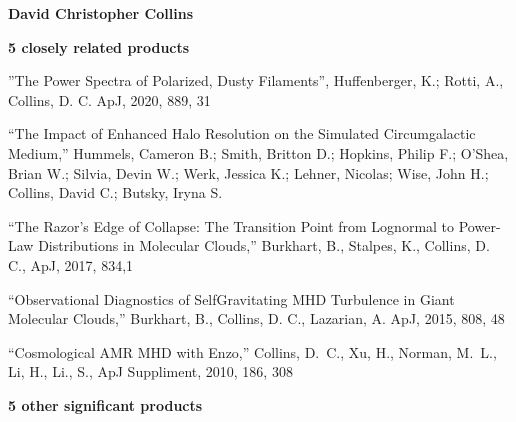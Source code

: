 \documentclass[11pt]{article}
\begin{document}
\noindent 
{\bf\large David Christopher Collins}

\medskip


\medskip

\noindent
\textbf{5 closely related products}

”The Power Spectra of Polarized, Dusty Filaments”, Huffenberger, K.; Rotti, A.,
Collins, D. C. ApJ, 2020, 889, 31

“The Impact of Enhanced Halo Resolution on the Simulated Circumgalactic Medium,”
Hummels, Cameron B.; Smith, Britton D.; Hopkins, Philip F.; O'Shea, Brian W.;
Silvia, Devin W.;
Werk, Jessica K.; Lehner, Nicolas; Wise, John H.; Collins, David C.; Butsky,
Iryna S.

“The Razor’s Edge of Collapse: The Transition Point from Lognormal to Power-Law
Distributions in Molecular Clouds,” Burkhart, B., Stalpes, K., Collins, D. C.,
ApJ, 2017, 834,1

“Observational Diagnostics of Self­Gravitating MHD Turbulence in Giant Molecular
Clouds,” Burkhart, B., Collins, D.  C., Lazarian, A.
ApJ,  2015, 808, 48

“Cosmological AMR MHD with Enzo,” Collins, D.~C., Xu, H., Norman, M.~L., Li, H.,
Li., S., ApJ Suppliment, 2010, 186, 308




\noindent
\textbf{5 other significant products}
\end{document}
